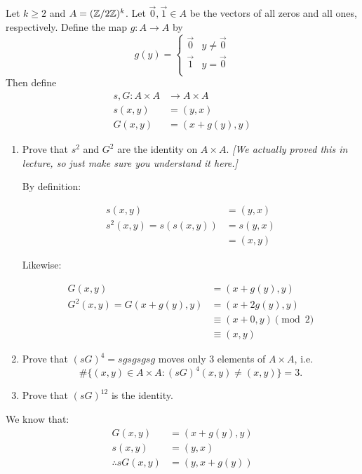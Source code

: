 \begin{problem}
  Let $k \geq 2$ and $A=(\mathbb{Z}/2\mathbb{Z})^k$.  Let $\vec{0}, \vec{1} \in A$ be
  the vectors of all zeros and all ones, respectively.  Define the map
  $g : A \to A$ by
\[
g(y) = 
\begin{cases}
\vec{0} & y \neq \vec{0} \\
\vec{1} & y = \vec{0} \\
\end{cases}
\]
Then define
\begin{align*} 
s,G: A \times A &\to A \times A \\
s(x,y) &= (y,x) \\
G(x,y) &= (x + g(y),y)
\end{align*}
\begin{enumerate}\renewcommand{\itemsep}{3mm}
\item Prove that $s^2$ and $G^2$ are the identity on $A \times A$.
\emph{[We actually proved this in lecture, so just make sure you
  understand it here.]}

\begin{Answer}

By definition:

\begin{align*}
  s(x, y) &= (y, x) \\
  s^2(x, y) = s(s(x, y)) &= s(y, x)\\
                         &= (x, y)
\end{align*}

\noindent
Likewise:

\begin{align*}
  G(x,y) &= (x+g(y), y)\\
  G^2(x,y) = G(x+g(y), y) &= (x+2g(y), y)\\
                          &\equiv (x+0, y) \pmod 2\\
                          &\equiv (x, y)
\end{align*}
\end{Answer}
\newpage
\item Prove that ${(sG)}^4=sgsgsgsg$ moves only $3$ elements of $A \times A$, i.e. 
\[ \#\{(x,y) \in A \times A:{(sG)}^4(x,y) \neq (x,y)\}=3. \]
\item Prove that ${(sG)}^{12}$ is the identity.
\end{enumerate}

\begin{Answer}
We know that:
\begin{align*}
  G(x,y) &= (x + g(y), y)\\
  s(x,y) &= (y,x)\\
  \therefore sG(x,y) &= (y, x+g(y)) 
\end{align*}


\end{Answer}
\end{problem}
